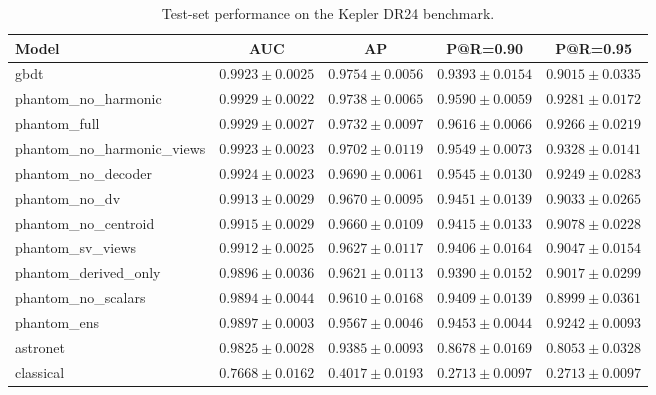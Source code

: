 \begin{table}[t]
\centering
\caption{Test-set performance on the Kepler DR24 benchmark.}
\label{tab:comparison}
\begin{tabular}{lcccc}
\toprule
Model & AUC & AP & P@R=0.90 & P@R=0.95 \\
\midrule
gbdt & $0.9923 \pm 0.0025$ & $0.9754 \pm 0.0056$ & $0.9393 \pm 0.0154$ & $0.9015 \pm 0.0335$ \\
phantom\_no\_harmonic & $0.9929 \pm 0.0022$ & $0.9738 \pm 0.0065$ & $0.9590 \pm 0.0059$ & $0.9281 \pm 0.0172$ \\
phantom\_full & $0.9929 \pm 0.0027$ & $0.9732 \pm 0.0097$ & $0.9616 \pm 0.0066$ & $0.9266 \pm 0.0219$ \\
phantom\_no\_harmonic\_views & $0.9923 \pm 0.0023$ & $0.9702 \pm 0.0119$ & $0.9549 \pm 0.0073$ & $0.9328 \pm 0.0141$ \\
phantom\_no\_decoder & $0.9924 \pm 0.0023$ & $0.9690 \pm 0.0061$ & $0.9545 \pm 0.0130$ & $0.9249 \pm 0.0283$ \\
phantom\_no\_dv & $0.9913 \pm 0.0029$ & $0.9670 \pm 0.0095$ & $0.9451 \pm 0.0139$ & $0.9033 \pm 0.0265$ \\
phantom\_no\_centroid & $0.9915 \pm 0.0029$ & $0.9660 \pm 0.0109$ & $0.9415 \pm 0.0133$ & $0.9078 \pm 0.0228$ \\
phantom\_sv\_views & $0.9912 \pm 0.0025$ & $0.9627 \pm 0.0117$ & $0.9406 \pm 0.0164$ & $0.9047 \pm 0.0154$ \\
phantom\_derived\_only & $0.9896 \pm 0.0036$ & $0.9621 \pm 0.0113$ & $0.9390 \pm 0.0152$ & $0.9017 \pm 0.0299$ \\
phantom\_no\_scalars & $0.9894 \pm 0.0044$ & $0.9610 \pm 0.0168$ & $0.9409 \pm 0.0139$ & $0.8999 \pm 0.0361$ \\
phantom\_ens & $0.9897 \pm 0.0003$ & $0.9567 \pm 0.0046$ & $0.9453 \pm 0.0044$ & $0.9242 \pm 0.0093$ \\
astronet & $0.9825 \pm 0.0028$ & $0.9385 \pm 0.0093$ & $0.8678 \pm 0.0169$ & $0.8053 \pm 0.0328$ \\
classical & $0.7668 \pm 0.0162$ & $0.4017 \pm 0.0193$ & $0.2713 \pm 0.0097$ & $0.2713 \pm 0.0097$ \\
\bottomrule
\end{tabular}
\end{table}